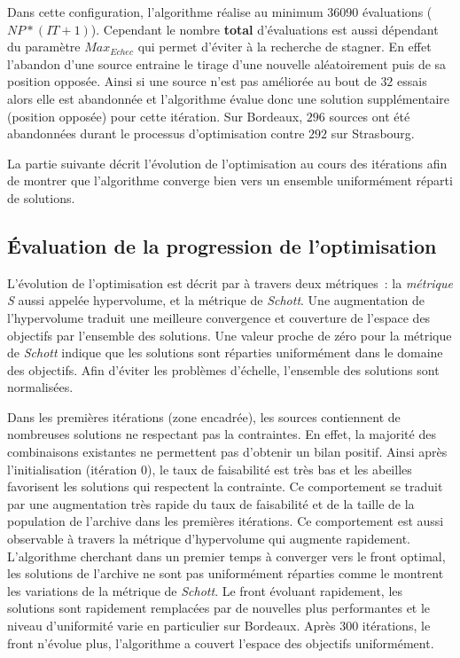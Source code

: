 Dans cette configuration, l’algorithme réalise au minimum \num{36090} évaluations
($NP * (IT + 1)$). Cependant le nombre \textbf{total} d’évaluations est aussi dépendant du paramètre
$Max_{Echec}$ qui permet d’éviter à la recherche de stagner. En effet l’abandon
d’une source entraine le tirage d’une nouvelle aléatoirement puis de sa position opposée.
Ainsi si une source n’est pas améliorée au bout
de $32$ essais alors elle est abandonnée et l’algorithme évalue donc une solution
supplémentaire (position opposée) pour cette itération. Sur Bordeaux, $296$ sources ont
été abandonnées durant le processus d’optimisation contre $292$ sur Strasbourg.

La partie suivante décrit l’évolution de l’optimisation au cours des itérations
afin de montrer que l’algorithme converge bien vers un ensemble uniformément réparti de solutions.



\subsection{Évaluation de la progression de l’optimisation} %
\label{sub:evaluation_de_la_progression_de_l_optimisation}
L’évolution de l’optimisation est décrit par  à
travers deux métriques~: la \textit{métrique S} aussi appelée hypervolume, et la métrique
de \textit{Schott}. Une augmentation de l’hypervolume traduit une meilleure convergence et
couverture de l’espace des objectifs par l’ensemble des solutions. Une valeur proche de
zéro pour la métrique de \textit{Schott} indique que les solutions sont réparties
uniformément dans le domaine des objectifs. Afin d’éviter les problèmes d’échelle,
l’ensemble des solutions sont normalisées.

Dans les premières itérations (zone encadrée), les sources contiennent de nombreuses
solutions ne respectant pas la contraintes. En effet, la majorité des combinaisons
existantes ne permettent pas d’obtenir un bilan positif. Ainsi après l’initialisation
(itération $0$), le taux de faisabilité est très bas et les abeilles favorisent
les solutions qui respectent la contrainte. Ce comportement se traduit par une
augmentation très rapide du taux de faisabilité et de la taille de la population de
l’archive dans les premières itérations. Ce comportement est aussi observable à travers la
métrique d’hypervolume qui augmente rapidement. L’algorithme cherchant dans un premier
temps à converger vers le front optimal, les solutions de l’archive ne sont pas
uniformément réparties comme le montrent les variations de la métrique de \textit{Schott}. Le front
évoluant rapidement, les solutions sont rapidement remplacées par de nouvelles plus
performantes et le niveau d’uniformité varie en particulier sur Bordeaux. Après $300$ itérations, le front n’évolue plus,
l’algorithme a couvert l’espace des objectifs uniformément.

